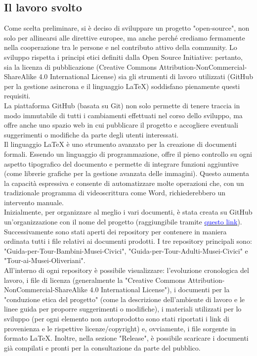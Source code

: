 \documentclass[hidelinks,12pt,a4paper]{article}
\begin{document}
\begin{flushleft}
        \subsection{Il lavoro svolto}
        Come scelta preliminare, si è deciso di sviluppare un progetto "open-source", non solo per allinearsi alle direttive europee, ma anche perché crediamo fermamente nella cooperazione tra le persone e nel contributo attivo della community. Lo sviluppo rispetta i principi etici definiti dalla Open Source Initiative: pertanto, sia la licenza di pubblicazione (Creative Commons Attribution-NonCommercial-ShareAlike 4.0 International License) sia gli strumenti di lavoro utilizzati (GitHub per la gestione asincrona e il linguaggio \LaTeX) soddisfano pienamente questi requisiti.\\
        La piattaforma GitHub (basata su Git) non solo permette di tenere traccia in modo immutabile di tutti i cambiamenti effettuati nel corso dello sviluppo, ma offre anche uno spazio web in cui pubblicare il progetto e accogliere eventuali suggerimenti o modifiche da parte degli utenti interessati.\\
        Il linguaggio \LaTeX{} è uno strumento avanzato per la creazione di documenti formali. Essendo un linguaggio di programmazione, offre il pieno controllo su ogni aspetto tipografico del documento e permette di integrare funzioni aggiuntive (come librerie grafiche per la gestione avanzata delle immagini). Questo aumenta la capacità espressiva e consente di automatizzare molte operazioni che, con un tradizionale programma di videoscrittura come Word, richiederebbero un intervento manuale.\\
        \bigskip
        Inizialmente, per organizzare al meglio i vari documenti, è stata creata su GitHub un'organizzazione con il nome del progetto (raggiungibile tramite \href{https://github.com/Pomodoro-Musei-di-Pesaro}{\textcolor{blue}{questo link}}). Successivamente sono stati aperti dei repository per contenere in maniera ordinata tutti i file relativi ai documenti prodotti. I tre repository principali sono: "Guida-per-Tour-Bambini-Musei-Civici", "Guida-per-Tour-Adulti-Musei-Civici" e "Tour-ai-Musei-Oliveriani".\\
        All'interno di ogni repository è possibile visualizzare: l'evoluzione cronologica del lavoro, i file di licenza (generalmente la "Creative Commons Attribution-NonCommercial-ShareAlike 4.0 International License"), i documenti per la "conduzione etica del progetto" (come la descrizione dell'ambiente di lavoro e le linee guida per proporre suggerimenti o modifiche), i materiali utilizzati per lo sviluppo (per ogni elemento non autoprodotto sono stati riportati i link di provenienza e le rispettive licenze/copyright) e, ovviamente, i file sorgente in formato \LaTeX. Inoltre, nella sezione "Release", è possibile scaricare i documenti già compilati e pronti per la consultazione da parte del pubblico.\\

\end{flushleft}
\end{document}
